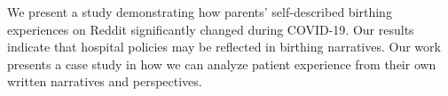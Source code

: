 We present a study demonstrating how parents' self-described birthing experiences on Reddit significantly changed during COVID-19. Our results indicate that hospital policies may be reflected in birthing narratives. Our work presents a case study in how we can analyze patient experience from their own written narratives and perspectives.
